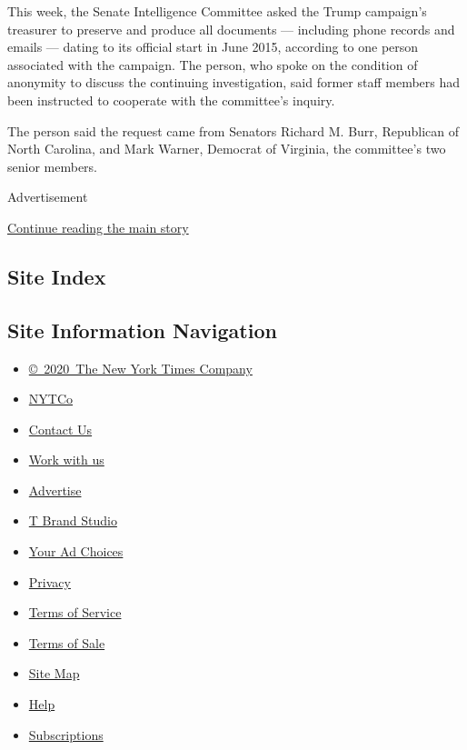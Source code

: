 This week, the Senate Intelligence Committee asked the Trump campaign's
treasurer to preserve and produce all documents --- including phone
records and emails --- dating to its official start in June 2015,
according to one person associated with the campaign. The person, who
spoke on the condition of anonymity to discuss the continuing
investigation, said former staff members had been instructed to
cooperate with the committee's inquiry.

The person said the request came from Senators Richard M. Burr,
Republican of North Carolina, and Mark Warner, Democrat of Virginia, the
committee's two senior members.

Advertisement

\protect\hyperlink{after-bottom}{Continue reading the main story}

\hypertarget{site-index}{%
\subsection{Site Index}\label{site-index}}

\hypertarget{site-information-navigation}{%
\subsection{Site Information
Navigation}\label{site-information-navigation}}

\begin{itemize}
\tightlist
\item
  \href{https://help.nytimes3xbfgragh.onion/hc/en-us/articles/115014792127-Copyright-notice}{©~2020~The
  New York Times Company}
\end{itemize}

\begin{itemize}
\tightlist
\item
  \href{https://www.nytco.com/}{NYTCo}
\item
  \href{https://help.nytimes3xbfgragh.onion/hc/en-us/articles/115015385887-Contact-Us}{Contact
  Us}
\item
  \href{https://www.nytco.com/careers/}{Work with us}
\item
  \href{https://nytmediakit.com/}{Advertise}
\item
  \href{http://www.tbrandstudio.com/}{T Brand Studio}
\item
  \href{https://www.nytimes3xbfgragh.onion/privacy/cookie-policy\#how-do-i-manage-trackers}{Your
  Ad Choices}
\item
  \href{https://www.nytimes3xbfgragh.onion/privacy}{Privacy}
\item
  \href{https://help.nytimes3xbfgragh.onion/hc/en-us/articles/115014893428-Terms-of-service}{Terms
  of Service}
\item
  \href{https://help.nytimes3xbfgragh.onion/hc/en-us/articles/115014893968-Terms-of-sale}{Terms
  of Sale}
\item
  \href{https://spiderbites.nytimes3xbfgragh.onion}{Site Map}
\item
  \href{https://help.nytimes3xbfgragh.onion/hc/en-us}{Help}
\item
  \href{https://www.nytimes3xbfgragh.onion/subscription?campaignId=37WXW}{Subscriptions}
\end{itemize}

